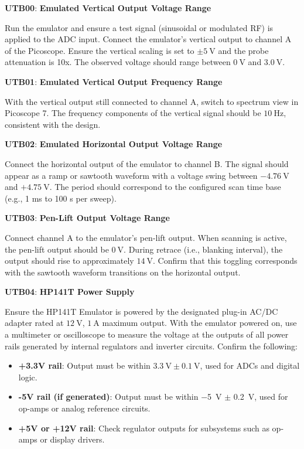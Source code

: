 \documentclass[class=report,11pt,crop=false]{standalone}
\begin{document}
	\begin{center}
		\textbf{UTB00}: \textbf{Emulated Vertical Output Voltage Range}
	\end{center}
	Run the emulator and ensure a test signal (sinusoidal or modulated RF) is applied to the ADC input. Connect the emulator’s vertical output to channel A of the Picoscope. Ensure the vertical scaling is set to $\pm\SI{5}{\volt}$ and the probe attenuation is 10x. The observed voltage should range between $\SI{0}{\volt}$ and $\SI{3.0}{\volt}$.
	
	\begin{center}
		\textbf{UTB01}: \textbf{Emulated Vertical Output Frequency Range}
	\end{center}
	With the vertical output still connected to channel A, switch to spectrum view in Picoscope 7. The frequency components of the vertical signal should be $\SI{10}{\hertz}$, consistent with the design.
	
	\begin{center}
		\textbf{UTB02}: \textbf{Emulated Horizontal Output Voltage Range}
	\end{center}
	Connect the horizontal output of the emulator to channel B. The signal should appear as a ramp or sawtooth waveform with a voltage swing between $-\SI{4.76}{\volt}$ and $+\SI{4.75}{\volt}$. The period should correspond to the configured scan time base (e.g., 1 ms to 100 s per sweep).
	
	\begin{center}
		\textbf{UTB03}: \textbf{Pen-Lift Output Voltage Range}
	\end{center}
	Connect channel A to the emulator’s pen-lift output. When scanning is active, the pen-lift output should be $\SI{0}{\volt}$. During retrace (i.e., blanking interval), the output should rise to approximately $\SI{14}{\volt}$. Confirm that this toggling corresponds with the sawtooth waveform transitions on the horizontal output.
	
	\begin{center}
		\textbf{UTB04}: \textbf{HP141T Power Supply}
	\end{center}
	Ensure the HP141T Emulator is powered by the designated plug-in AC/DC adapter rated at $\SI{12}{\volt}$, $\SI{1}{\ampere}$ maximum output. With the emulator powered on, use a multimeter or oscilloscope to measure the voltage at the outputs of all power rails generated by internal regulators and inverter circuits. Confirm the following:
	
	\begin{itemize}
		\item \textbf{+3.3V rail}: Output must be within $\SI{3.3}{\volt} \pm \SI{0.1}{\volt}$, used for ADCs and digital logic.
		\item \textbf{-5V rail (if generated)}: Output must be within \SI{-5}{\volt} $\pm$ \SI{0.2}{\volt}, used for op-amps or analog reference circuits.
		\item \textbf{+5V or +12V rail}: Check regulator outputs for subsystems such as op-amps or display drivers.
	\end{itemize}
	
\end{document}
